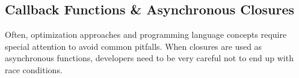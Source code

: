 






\subsection{Callback Functions \& Asynchronous Closures}

Often, optimization approaches and programming language concepts require special attention to avoid common pitfalls.
When closures are used as asynchronous functions, developers need to be very careful not to end up with race conditions.


